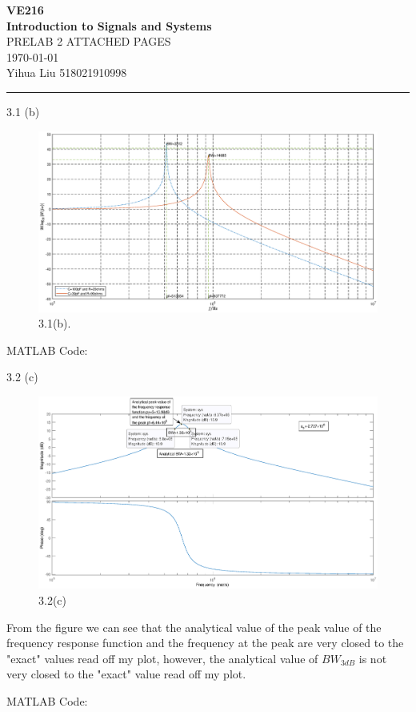 \documentclass[a4paper]{article}
\begin{document}
\begin{center}
\huge
\textbf{VE216\\Introduction to Signals and Systems\\}
\Large
\vspace{30pt}
\uppercase{Prelab 2 Attached Pages}\\
\vspace{5pt}\today\\
\vspace{5pt}
Yihua Liu 518021910998
\vspace{5pt}
\rule[-10pt]{.97\linewidth}{0.05em}
\end{center}

3.1 (b)
\begin{figure}[H]
    \begin{center}
        \includegraphics[width=1\textwidth]{3.1(b).eps}
    \end{center}
    \caption{3.1(b).}
\end{figure}
MATLAB Code:


3.2 (c)
\begin{figure}[H]
    \begin{center}
        \includegraphics[width=1\textwidth]{3.2(c).eps}
    \end{center}
    \caption{3.2(c)}
\end{figure}
From the figure we can see that the analytical value of the peak value of the frequency response function and the frequency at the peak are very closed to the "exact" values read off my plot, however, the analytical value of $BW_{3dB}$ is not very closed to the "exact" value read off my plot.

MATLAB Code:

\end{document}
